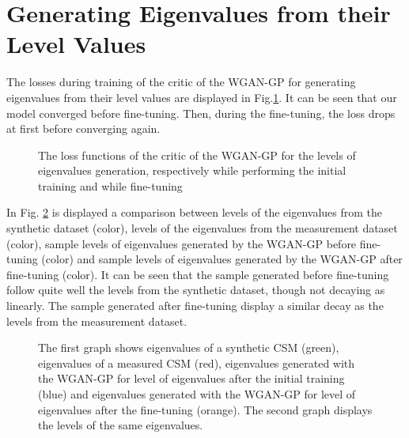 \documentclass[11pt,a4paper,twoside]{report}
\begin{document}
\section{Generating Eigenvalues from their Level Values}

The losses during training of the critic of the WGAN-GP for generating eigenvalues from their level values are displayed in Fig.\ref{fig:loss_evals_dB_wgangp}. It can be seen that our model converged before fine-tuning. Then, during the fine-tuning, the loss drops at first before converging again.

\begin{figure}
    \centering
    \caption{The loss functions of the critic of the WGAN-GP for the levels of eigenvalues generation, respectively while performing the initial training and while fine-tuning}
    \label{fig:loss_evals_dB_wgangp}
\end{figure}


In Fig. \ref{fig:samples_evals_dB_wgangp} is displayed a comparison between levels of the eigenvalues from the synthetic dataset (color), levels of the eigenvalues from the measurement dataset (color), sample levels of eigenvalues generated by the WGAN-GP before fine-tuning (color) and sample levels of eigenvalues generated by the WGAN-GP after fine-tuning (color). It can be seen that the sample generated before fine-tuning follow quite well the levels from the synthetic dataset, though not decaying as linearly. The sample generated after fine-tuning display a similar decay as the levels from the measurement dataset.

\begin{figure}
    \centering
    \caption{The first graph shows eigenvalues of a synthetic CSM (green), eigenvalues of a measured CSM (red), eigenvalues generated with the WGAN-GP for level of eigenvalues after the initial training (blue) and eigenvalues generated with the WGAN-GP for level of eigenvalues after the fine-tuning (orange). The second graph displays the levels of the same eigenvalues.}
    \label{fig:samples_evals_dB_wgangp}
\end{figure}
\end{document}
